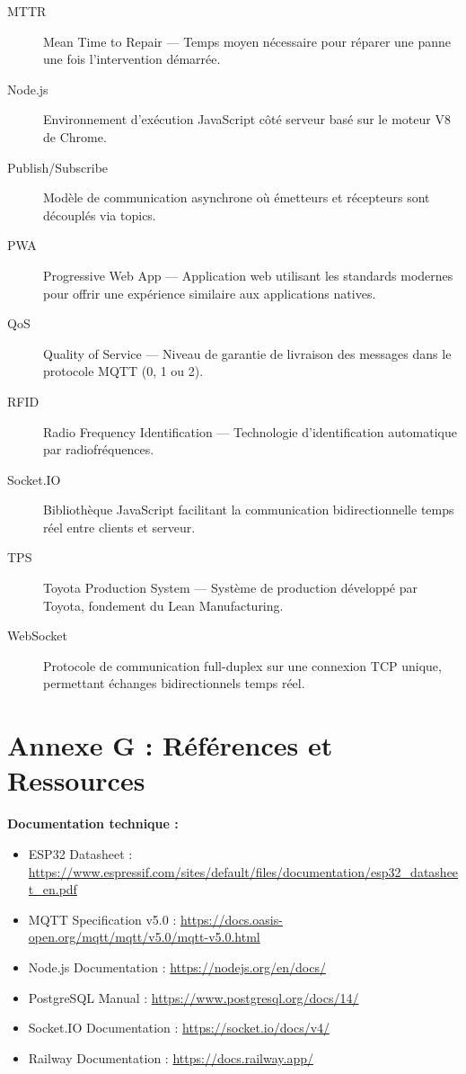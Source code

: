\begin{description}
    \item[MTTR] Mean Time to Repair --- Temps moyen nécessaire pour réparer une panne une fois l'intervention démarrée.
    
    \item[Node.js] Environnement d'exécution JavaScript côté serveur basé sur le moteur V8 de Chrome.
    
    \item[Publish/Subscribe] Modèle de communication asynchrone où émetteurs et récepteurs sont découplés via topics.
    
    \item[PWA] Progressive Web App --- Application web utilisant les standards modernes pour offrir une expérience similaire aux applications natives.
    
    \item[QoS] Quality of Service --- Niveau de garantie de livraison des messages dans le protocole MQTT (0, 1 ou 2).
    
    \item[RFID] Radio Frequency Identification --- Technologie d'identification automatique par radiofréquences.
    
    \item[Socket.IO] Bibliothèque JavaScript facilitant la communication bidirectionnelle temps réel entre clients et serveur.
    
    \item[TPS] Toyota Production System --- Système de production développé par Toyota, fondement du Lean Manufacturing.
    
    \item[WebSocket] Protocole de communication full-duplex sur une connexion TCP unique, permettant échanges bidirectionnels temps réel.
\end{description}

\section{Annexe G : Références et Ressources}

\textbf{Documentation technique :}
\begin{itemize}
    \item ESP32 Datasheet : \url{https://www.espressif.com/sites/default/files/documentation/esp32_datasheet_en.pdf}
    \item MQTT Specification v5.0 : \url{https://docs.oasis-open.org/mqtt/mqtt/v5.0/mqtt-v5.0.html}
    \item Node.js Documentation : \url{https://nodejs.org/en/docs/}
    \item PostgreSQL Manual : \url{https://www.postgresql.org/docs/14/}
    \item Socket.IO Documentation : \url{https://socket.io/docs/v4/}
    \item Railway Documentation : \url{https://docs.railway.app/}
\end{itemize}

